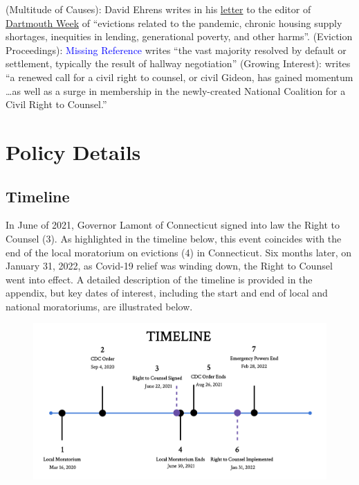 \documentclass[a4paper,12pt]{article}
\begin{document}
(Multitude of Causes):  David Ehrens writes in his \href{https://dartmouth.theweektoday.com/article/opinion-support-right-counsel-renters/58185}{letter} to the editor of \href{https://dartmouth.theweektoday.com/}{Dartmouth Week} of ``evictions related to the pandemic, chronic housing supply shortages, inequities in lending, generational poverty, and other harms''. (Eviction Proceedings): \textcolor{blue}{Missing Reference} writes ``the vast majority resolved by default or settlement, typically the result of hallway negotiation'' (Growing Interest): \cite{engler2010connecting} writes ``a renewed call for a civil right to counsel, or civil Gideon, has gained momentum \dots as well as a surge in membership in the newly-created National Coalition for a Civil Right to Counsel.''

\section{Policy Details}
\subsection{Timeline}
In June of 2021, Governor Lamont of Connecticut signed into law the Right to Counsel (3). As highlighted in the timeline below, this event coincides with the end of the local moratorium on evictions (4) in Connecticut. Six months later, on January 31, 2022, as Covid-19 relief was winding down, the Right to Counsel went into effect. A detailed description of the timeline is provided in the appendix, but key dates of interest, including the start and end of local and national moratoriums, are illustrated below. 
\par 
\begin{figure}[htbp]
\centering
    \centering
    \includegraphics[width=.60\linewidth]{figures/rtc/context/timeline.png}
    \label{SUBFIGURE LABEL 3}
\end{figure}
\end{document}
